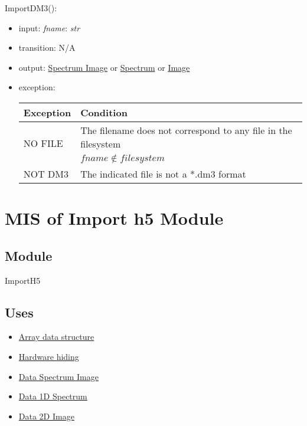 \documentclass[12pt, titlepage]{article}
\begin{document}
\noindent ImportDM3():
\begin{itemize}
    \item input: \textit{fname}: \textit{str}
    \item transition: N/A
    \item output: \hyperref[Mod:SI]{Spectrum Image} or
    \hyperref[Mod:Spectrum]{Spectrum} or \hyperref[Mod:Image]{Image}
    \item exception: 
    \begin{center}
        \begin{tabular}{p{3cm} p{12cm}}
            \toprule[0.15em]
            \textbf{Exception} & \textbf{Condition}\\
            \midrule[0.1em]
            \multirow{2}{0.25\textwidth}{NO FILE} & The filename does not correspond
            to any file in the filesystem\\ 
            & $fname \notin filesystem$\\ 
            \midrule[0.05em]
            NOT DM3 & The indicated file is not a *.dm3 format\\
            \bottomrule[0.15em]
        \end{tabular}
    \end{center}
    
\end{itemize}

\section{MIS of Import h5 Module} \label{Mod:ImportH5} 

\subsection{Module}
ImportH5

\subsection{Uses}
\begin{itemize}
    \item \hyperref[Mod:Array]{Array data structure}
    \item \hyperref[Mod:HH]{Hardware hiding}
    \item \hyperref[Mod:SI]{Data Spectrum Image}
    \item \hyperref[Mod:Spectrum]{Data 1D Spectrum}
    \item \hyperref[Mod:Image]{Data 2D Image}
\end{itemize}
\end{document}
